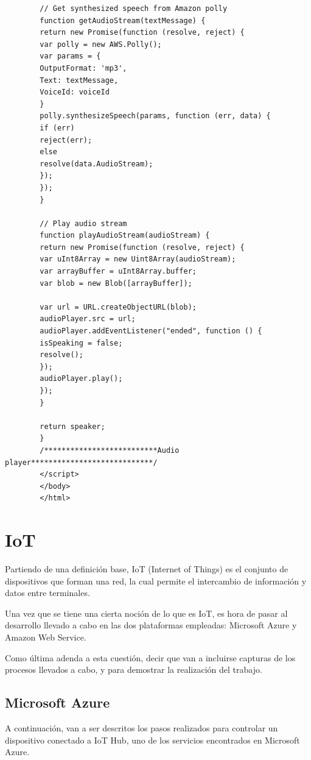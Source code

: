 \documentclass[english,runningheads,a4paper]{llncs}[2018/03/10]
\begin{document}
\begin{verbatim}
        // Get synthesized speech from Amazon polly
        function getAudioStream(textMessage) {
        return new Promise(function (resolve, reject) {
        var polly = new AWS.Polly();
        var params = {
        OutputFormat: 'mp3',
        Text: textMessage,
        VoiceId: voiceId
        }
        polly.synthesizeSpeech(params, function (err, data) {
        if (err)
        reject(err);
        else
        resolve(data.AudioStream);
        });
        });
        }
        
        // Play audio stream
        function playAudioStream(audioStream) {
        return new Promise(function (resolve, reject) {
        var uInt8Array = new Uint8Array(audioStream);
        var arrayBuffer = uInt8Array.buffer;
        var blob = new Blob([arrayBuffer]);
        
        var url = URL.createObjectURL(blob);
        audioPlayer.src = url;
        audioPlayer.addEventListener("ended", function () {
        isSpeaking = false;
        resolve();
        });
        audioPlayer.play();
        });
        }
        
        return speaker;
        }
        /**************************Audio player****************************/
        </script>
        </body>
        </html>
   \end{verbatim}
    
    \newpage
\section{IoT}

Partiendo de una definición base, IoT (Internet of Things) es el conjunto de
dispositivos que forman una red, la cual permite el intercambio de información y
datos entre terminales.

Una vez que se tiene una cierta noción de lo que es IoT, es hora de pasar al
desarrollo llevado a cabo en las dos plataformas empleadas: Microsoft Azure y
Amazon Web Service.

Como última adenda a esta cuestión, decir que van a incluirse capturas de los
procesos llevados a cabo, y para demostrar la realización del trabajo.

\subsection*{Microsoft Azure}

A continuación, van a ser descritos los pasos realizados para controlar un
dispositivo conectado a IoT Hub, uno de los servicios encontrados en Microsoft
Azure.
\end{document}

